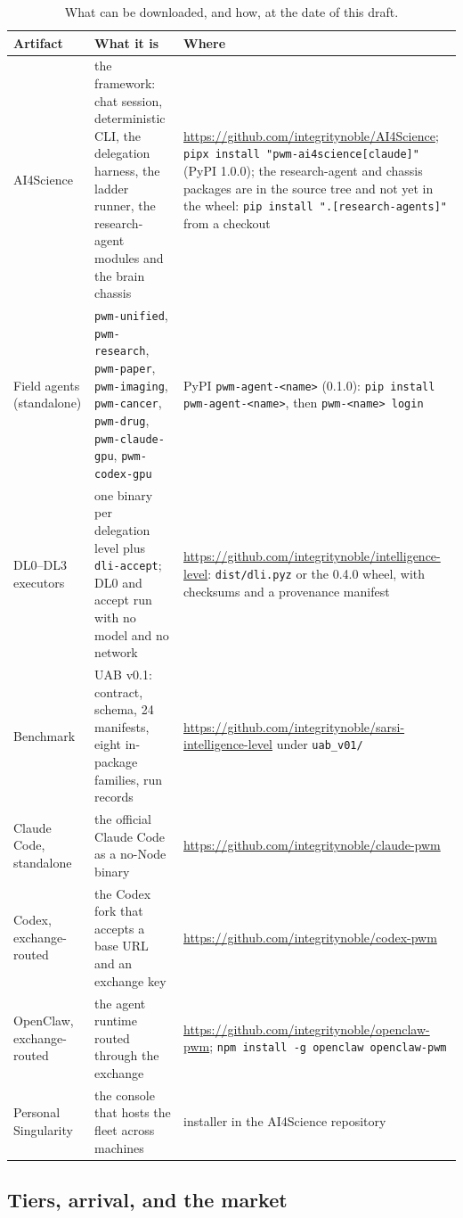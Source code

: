 \documentclass[11pt]{article}
\theoremstyle{definition}
\begin{document}
\begin{table}[!htbp]
\centering\footnotesize
\begin{tabularx}{\textwidth}{@{}lYY@{}}
\toprule
Artifact & What it is & Where \\
\midrule
AI4Science & the framework: chat session, deterministic CLI, the delegation harness, the ladder runner, the research-agent modules and the brain chassis & \url{https://github.com/integritynoble/AI4Science}; \texttt{pipx install "pwm-ai4science[claude]"} (PyPI 1.0.0); the research-agent and chassis packages are in the source tree and not yet in the wheel: \texttt{pip install ".[research-agents]"} from a checkout \\
Field agents (standalone) & \texttt{pwm-unified}, \texttt{pwm-research}, \texttt{pwm-paper}, \texttt{pwm-imaging}, \texttt{pwm-cancer}, \texttt{pwm-drug}, \texttt{pwm-claude-gpu}, \texttt{pwm-codex-gpu} & PyPI \texttt{pwm-agent-<name>} (0.1.0): \texttt{pip install pwm-agent-<name>}, then \texttt{pwm-<name> login} \\
DL0--DL3 executors & one binary per delegation level plus \texttt{dli-accept}; DL0 and accept run with no model and no network & \url{https://github.com/integritynoble/intelligence-level}: \texttt{dist/dli.pyz} or the 0.4.0 wheel, with checksums and a provenance manifest \\
Benchmark & UAB v0.1: contract, schema, 24 manifests, eight in-package families, run records & \url{https://github.com/integritynoble/sarsi-intelligence-level} under \texttt{uab\_v01/} \\
Claude Code, standalone & the official Claude Code as a no-Node binary & \url{https://github.com/integritynoble/claude-pwm} \\
Codex, exchange-routed & the Codex fork that accepts a base URL and an exchange key & \url{https://github.com/integritynoble/codex-pwm} \\
OpenClaw, exchange-routed & the agent runtime routed through the exchange & \url{https://github.com/integritynoble/openclaw-pwm}; \texttt{npm install -g openclaw openclaw-pwm} \\
Personal Singularity & the console that hosts the fleet across machines & installer in the AI4Science repository \\
\bottomrule
\end{tabularx}
\caption{What can be downloaded, and how, at the date of this draft.}
\label{tab:downloads}
\end{table}

\subsection{Tiers, arrival, and the market}\label{sec:tiers}
\end{document}
